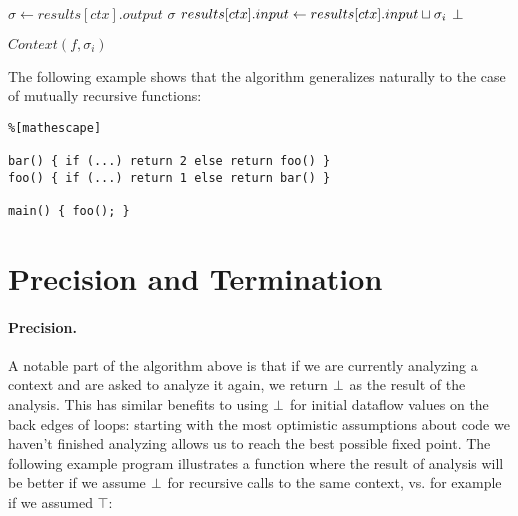 \documentclass[11pt]{article}
\begin{document}
\begin{algorithmic}
\bigskip

    \State $\sigma \gets results[ctx].output$
        \State \Return $\sigma$ 
    \EndIf
    \State $results[ctx].input \gets results[ctx].input \sqcup \sigma_i$ 
        \State \Return $\bot$ 
    \Else
        \State \Return {}
    \EndIf
\EndFunction

\bigskip

    \State \Return $Context(f, \sigma_i)$ 
\EndFunction

\end{algorithmic}

The following example shows that the algorithm generalizes naturally to the case of mutually recursive functions:

\begin{lstlisting}%[mathescape]

bar() { if (...) return 2 else return foo() }
foo() { if (...) return 1 else return bar() }

main() { foo(); }
\end{lstlisting}

\section{Precision and Termination}

\paragraph{Precision.} A notable part of the algorithm above is that if we are currently analyzing a context and are asked
to analyze it again, we return $\bot$ as the result of the analysis. This has similar benefits to using $\bot$ for
initial dataflow values on the back edges of loops: starting with the most optimistic assumptions
about code we haven’t finished analyzing allows us to reach the best possible fixed point. The
following example program illustrates a function where the result of analysis will be better if we
assume $\bot$ for recursive calls to the same context, vs. for example if we assumed $\top$:
\end{document}
